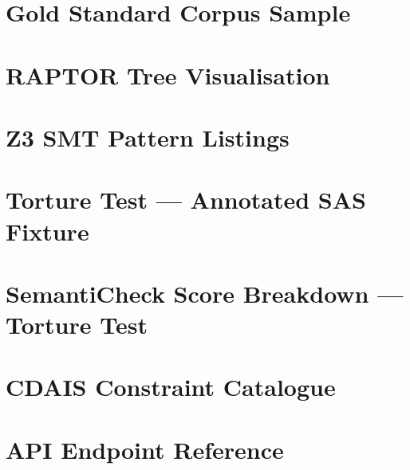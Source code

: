 \documentclass[12pt,a4paper]{report}
\begin{document}
\chapter{Gold Standard Corpus Sample}
\label{app:gold-corpus}

\chapter{RAPTOR Tree Visualisation}
\label{app:raptor-tree}

\chapter{Z3 SMT Pattern Listings}
\label{app:z3-patterns}

\chapter{Torture Test --- Annotated SAS Fixture}
\label{app:torture-test}

\chapter{SemantiCheck Score Breakdown --- Torture Test}
\label{app:semanticheck-scores}

\chapter{CDAIS Constraint Catalogue}
\label{app:cdais-catalogue}

\chapter{API Endpoint Reference}
\label{app:api-reference}

\end{document}
